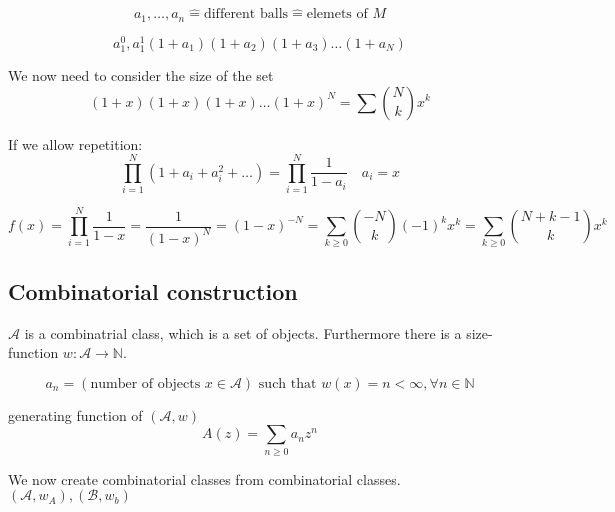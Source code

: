 \[
    a_1, \ldots , a_n \mathrel{\hat{=}} \text{different balls} \mathrel{\hat{=}} \text{elemets of } M
\]

\[
    a_1^0, a_1^1 
    (1+a_1)(1+a_2)(1+a_3) \ldots (1+a_N)
\]

We now need to consider the size of the set
\[
    (1+x)(1+x)(1+x) \ldots (1+x)^N = \sum {N \choose k} x^k
\]

If we allow repetition: 
\[
    \prod _{i=1}^N (1+a_i + a_i^2 + \ldots) = \prod _{i=1}^N \frac{1}{1-a_i} \quad a_i = x
\]

\[
    f(x) = \prod _{i=1}^N \frac{1}{1-x} = \frac{1}{(1-x)^N} 
    = (1-x)^{-N} 
    = \sum _{k \geq 0} {-N \choose k} (-1)^k x^k
    = \sum _{k \geq 0} {N + k-1 \choose k} x^k
\]

\subsection{Combinatorial construction}
$\mathcal{A}$ is a combinatrial class, which is a set of objects. 
Furthermore there is a size-function $w: \mathcal{A} \rightarrow \mathbb{N}$. 

\[
a_n = \left(\text{number of objects } x\in \mathcal{A}\right) \text{ such that }w(x) = n < \infty,  \forall n \in \mathbb{N}
\]

generating function of $(\mathcal{A}, w)$ 
\[
    A(z) = \sum_{n\geq 0 } a_n z^n
\]

We now create combinatorial classes from combinatorial classes.
$(\mathcal{A}, w_A) , (\mathcal{B}, w_b)$

